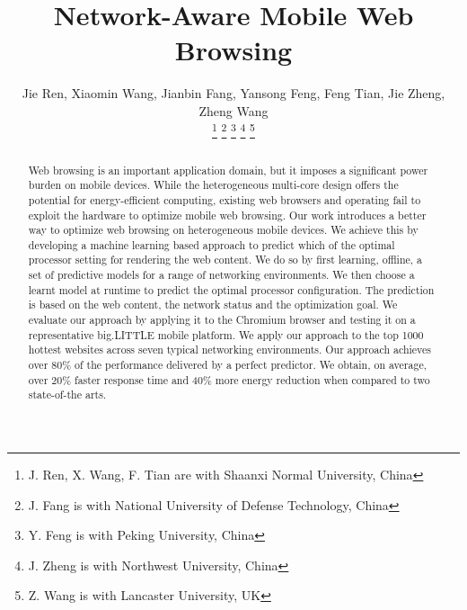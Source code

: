 \documentclass[journal]{IEEEtran}
\begin{document}
\title{Network-Aware Mobile Web Browsing}


\author{
Jie Ren, Xiaomin Wang, Jianbin Fang, Yansong Feng, Feng Tian, Jie Zheng, Zheng Wang

 \thanks{J. Ren, X. Wang, F. Tian are with Shaanxi Normal University, China}%
 \thanks{J. Fang is with National University of Defense Technology, China}
 \thanks{Y. Feng is with Peking University, China}
 \thanks{J. Zheng is with Northwest University, China}
 \thanks{Z. Wang is with Lancaster University, UK}

}


%
%



\maketitle

\begin{abstract}
Web browsing is an important application domain, but it imposes a significant power burden on mobile devices. While the heterogeneous
multi-core design offers the potential for energy-efficient computing, existing web browsers and operating fail to exploit the hardware
to optimize mobile web browsing. Our work introduces a better way to optimize web browsing on heterogeneous mobile devices. We achieve
this by developing a machine learning based approach to predict which of the optimal processor setting for rendering the web content. We
do so by first learning, offline, a set of predictive models for a range of networking environments. We then choose a learnt model at
runtime to predict the optimal processor configuration. The prediction is based on the web content, the network status and the
optimization goal. We evaluate our approach by applying it to the Chromium browser and testing it on a representative big.LITTLE mobile
platform. We apply our approach to the top 1000 hottest websites across seven typical networking environments. Our approach achieves over
80\% of the performance delivered by a perfect predictor. We obtain, on average, over 20\% faster response time and 40\% more energy
reduction when compared to two state-of-the arts.
\end{abstract}
\end{document}
